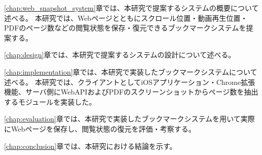 \ref{chap:web_snapshot_system}章では、本研究で提案するシステムの概要について述べる。
本研究では、Webページとともにスクロール位置・動画再生位置・PDFのページ数などの閲覧状態を保存・復元できるブックマークシステムを提案する。

\ref{chap:design}章では、本研究で提案するシステムの設計について述べる。

\ref{chap:implementation}章では、本研究で実装したブックマークシステムについて述べる。
本研究では、クライアントとしてiOSアプリケーション・Chrome拡張機能、サーバ側にWebAPIおよびPDFのスクリーンショットからページ数を抽出するモジュールを実装した。

\ref{chap:evaluation}章では、本研究で実装したブックマークシステムを用いて実際にWebページを保存し、閲覧状態の復元を評価・考察する。

\ref{chap:conclusion}章では、本研究における結論を示す。
